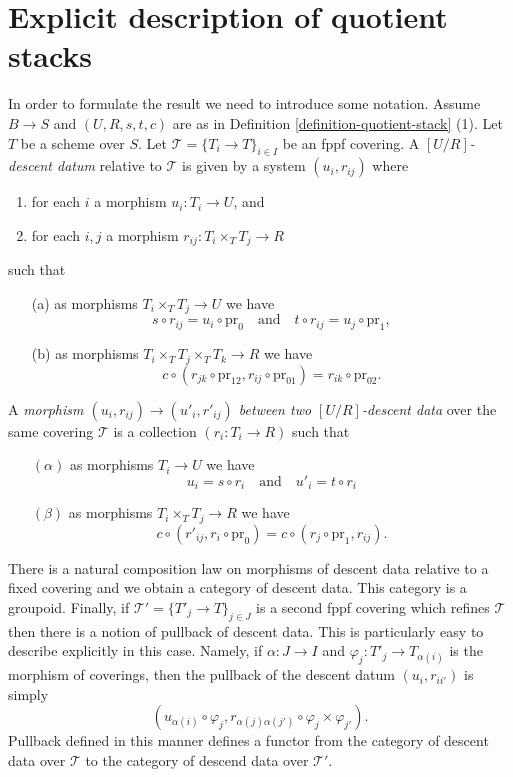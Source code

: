 \section{Explicit description of quotient stacks}
\label{section-explicit-quotient-stacks}

\noindent
In order to formulate the result we need to introduce some
notation. Assume $B \to S$ and $(U, R, s, t, c)$ are as in
Definition \ref{definition-quotient-stack} (1).
Let $T$ be a scheme over $S$. Let $\mathcal{T} = \{T_i \to T\}_{i \in I}$
be an fppf covering. A {\it $[U/R]$-descent datum} relative
to $\mathcal{T}$ is given by a system $(u_i, r_{ij})$ where
\begin{enumerate}
\item for each $i$ a morphism $u_i : T_i \to U$, and
\item for each $i, j$ a morphism $r_{ij} : T_i \times_T T_j \to R$
\end{enumerate}
such that
\begin{enumerate}
\item[(a)] as morphisms $T_i \times_T T_j \to U$ we have
$$
s \circ r_{ij} = u_i \circ \text{pr}_0
\quad\text{and}\quad
t \circ r_{ij} = u_j \circ \text{pr}_1,
$$
\item[(b)] as morphisms $T_i \times_T T_j \times_T T_k \to R$ we have
$$
c \circ (r_{jk} \circ \text{pr}_{12}, r_{ij} \circ \text{pr}_{01})
= r_{ik} \circ \text{pr}_{02}.
$$
\end{enumerate}
A {\it morphism $(u_i, r_{ij}) \to (u'_i, r'_{ij})$ between two
$[U/R]$-descent data} over the same covering $\mathcal{T}$
is a collection $(r_i : T_i \to R)$ such that
\begin{enumerate}
\item[$(\alpha)$] as morphisms $T_i \to U$ we have
$$
u_i = s \circ r_i
\quad\text{and}\quad
u'_i = t \circ r_i
$$
\item[$(\beta)$] as morphisms $T_i \times_T T_j \to R$ we have
$$
c \circ (r'_{ij}, r_i \circ \text{pr}_0)
=
c \circ (r_j \circ \text{pr}_1, r_{ij}).
$$
\end{enumerate}
There is a natural composition law on morphisms of descent data relative
to a fixed covering and we obtain a category of descent data.
This category is a groupoid. Finally, if
$\mathcal{T}' = \{T'_j \to T\}_{j \in J}$
is a second fppf covering which refines $\mathcal{T}$ then there
is a notion of pullback of descent data. This is particularly easy to
describe explicitly in this case. Namely, if $\alpha : J \to I$ and
$\varphi_j : T'_j \to T_{\alpha(i)}$ is the morphism of coverings, then
the pullback of the descent datum $(u_i, r_{ii'})$ is simply
$$
(u_{\alpha(i)} \circ \varphi_j,
r_{\alpha(j)\alpha(j')} \circ \varphi_j \times \varphi_{j'}).
$$
Pullback defined in this manner defines a functor from the category of
descent data over $\mathcal{T}$ to the category of descend data over
$\mathcal{T}'$.

